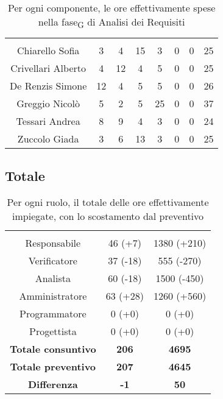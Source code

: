 \begin{table}[H]
	\begin{center}
		\begin{tabular}{c
				!{\color[HTML]{9b240a}\vrule width 1pt}
				cccccc
				!{\color[HTML]{9b240a}\vrule width 1pt}	
				c}
			\rowcolorhead
			 &  &  &  &  &  &  &  \\
			
			Chiarello Sofia & 3 & 4 & 15 & 3 & 0 & 0 & 25\\
			Crivellari Alberto & 4 & 12 & 4 & 5 & 0 & 0 & 25\\
			De Renzis Simone & 12 & 4 & 5 & 5 & 0 & 0 & 26\\
			Greggio Nicolò & 5 & 2 & 5 & 25 & 0 & 0 & 37\\
			Tessari Andrea & 8 & 9 & 4 & 3 & 0 & 0 & 24\\
			Zuccolo Giada & 3 & 6 & 13 & 3 & 0 & 0 & 25\\
		\end{tabular}
		\caption[Consuntivo fase\textsubscript{G} di Analisi dei Requisiti]{Per ogni componente, le ore effettivamente spese nella fase\textsubscript{G} di Analisi dei Requisiti}
	\end{center}
\end{table}



\subsection{Totale}

\begin{table}[H]
	\centering
	\begin{tabular}{ccc}
		\rowcolorhead
		\headertitle{Ruolo} & \headertitle{Ore} & \headertitle{Costo(\euro{})}\\
		Responsabile & 46 (+7) & 1380 (+210) \\
		Verificatore & 37 (-18) & 555 (-270)\\
		Analista & 60 (-18) & 1500 (-450)\\				
		Amministratore & 63 (+28) & 1260 (+560)\\
		Programmatore & 0 (+0) & 0 (+0)\\
		Progettista & 0 (+0) & 0 (+0)\\
		\hline		
		\textbf{Totale consuntivo} & \textbf{206} & \textbf{4695}\\
		\textbf{Totale preventivo} & \textbf{207} & \textbf{4645}\\
		\textbf{Differenza} & \textbf{-1} & \textbf{50}\\
	\end{tabular}
	\caption[Confronto tra preventivo e consuntivo]{Per ogni ruolo, il totale delle ore effettivamente impiegate, con lo scostamento dal preventivo}
\end{table}


